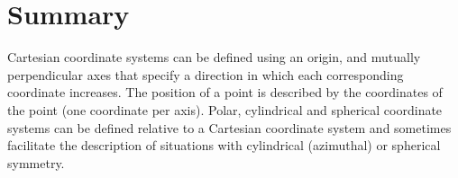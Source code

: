 \newpage
\section{Summary}
\vspace{0.5cm}

\begin{chapterSummary}
Cartesian coordinate systems can be defined using an origin, and mutually perpendicular axes that specify a direction in which each corresponding coordinate increases. The position of a point is described by the coordinates of the point (one coordinate per axis). Polar, cylindrical and spherical coordinate systems can be defined relative to a Cartesian coordinate system and sometimes facilitate the description of situations with cylindrical (azimuthal) or spherical symmetry. 


\end{chapterSummary}
